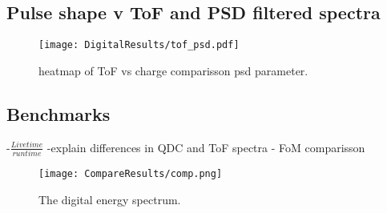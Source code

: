 \documentclass[main.tex]{subfiles}
\begin{document}
\subsection{Pulse shape v ToF and PSD filtered spectra}

\begin{figure}[h!]
    \centering
        \texttt{[image: DigitalResults/tof\_psd.pdf]}
        \caption{heatmap of ToF vs charge comparisson psd parameter.}
    \label{fig:tof_ps_d} 
\end{figure}

\subsection{Benchmarks}
-$\frac{Livetime}{runtime}$
\newline-explain differences in QDC and ToF spectra
\newline- FoM comparisson
\begin{figure}[h]
    \centering
        \texttt{[image: CompareResults/comp.png]}
        \caption{The digital energy spectrum.}
    \label{fig:D_QDC}
\end{figure}
\end{document}
